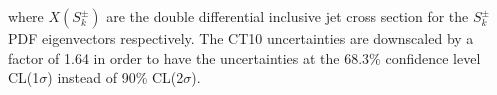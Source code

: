 where $X(S_k^{\pm})$ are the double differential inclusive jet cross section for the $S_k^{\pm}$ PDF eigenvectors respectively.
The CT10 uncertainties are downscaled by a factor of 1.64 in order to have the uncertainties at the 68.3\% confidence level CL(1$\sigma$)
instead of 90\% CL(2$\sigma$).  

